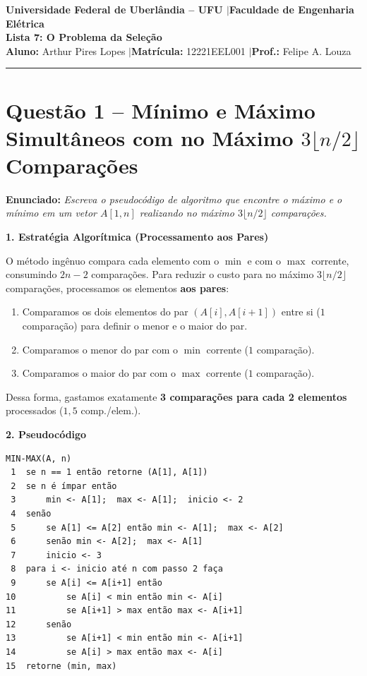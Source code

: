 \documentclass[10pt,a4paper]{article}
\newcommand{\topico}[1]{\smallskip\noindent\textbf{\color{azul}#1}\par}
\newcommand{\questao}[2]{\section*{\large\color{azul}Questão #1 -- #2}\vspace{-4pt}}
\begin{document}
\begin{center}
  \textbf{\large Universidade Federal de Uberlândia -- UFU \quad$|$\quad Faculdade de Engenharia Elétrica}\\[2pt]
  {\Large\bfseries\color{azul} Lista 7: O Problema da Seleção}\\[2pt]
  \textbf{Aluno:} Arthur Pires Lopes \quad$|$\quad \textbf{Matrícula:} 12221EEL001 \quad$|$\quad \textbf{Prof.:} Felipe A. Louza
\end{center}
\hrule
\vspace{4pt}

\questao{1}{Mínimo e Máximo Simultâneos com no Máximo $3\lfloor n/2 \rfloor$ Comparações}

\textbf{Enunciado:} \textit{Escreva o pseudocódigo de algoritmo que encontre o máximo e o mínimo em um vetor $A[1, n]$ realizando no máximo $3\lfloor n/2 \rfloor$ comparações.}

\topico{1. Estratégia Algorítmica (Processamento aos Pares)}
O método ingênuo compara cada elemento com o $\min$ e com o $\max$ corrente, consumindo $2n - 2$ comparações. 
Para reduzir o custo para no máximo $3\lfloor n/2 \rfloor$ comparações, processamos os elementos \textbf{aos pares}:
\begin{enumerate}
    \setlength{\itemsep}{0pt}
    \item Comparamos os dois elementos do par $(A[i], A[i+1])$ entre si ($1$ comparação) para definir o menor e o maior do par.
    \item Comparamos o menor do par com o $\min$ corrente ($1$ comparação).
    \item Comparamos o maior do par com o $\max$ corrente ($1$ comparação).
\end{enumerate}
Dessa forma, gastamos exatamente \textbf{3 comparações para cada 2 elementos} processados ($1{,}5$ comp./elem.).

\topico{2. Pseudocódigo}
\begin{lstlisting}
MIN-MAX(A, n)
 1  se n == 1 então retorne (A[1], A[1])
 2  se n é ímpar então
 3      min <- A[1];  max <- A[1];  inicio <- 2
 4  senão
 5      se A[1] <= A[2] então min <- A[1];  max <- A[2]
 6      senão min <- A[2];  max <- A[1]
 7      inicio <- 3
 8  para i <- inicio até n com passo 2 faça
 9      se A[i] <= A[i+1] então
10          se A[i] < min então min <- A[i]
11          se A[i+1] > max então max <- A[i+1]
12      senão
13          se A[i+1] < min então min <- A[i+1]
14          se A[i] > max então max <- A[i]
15  retorne (min, max)
\end{lstlisting}
\end{document}
